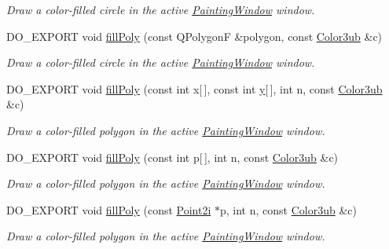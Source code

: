 \begin{DoxyCompactItemize}
\begin{DoxyCompactList}\small\item\em Draw a color-\/filled circle in the active \hyperlink{class_d_o_1_1_painting_window}{Painting\-Window} window. \end{DoxyCompactList}\item 
D\-O\-\_\-\-E\-X\-P\-O\-R\-T void \hyperlink{group___draw2_d_ga4123a714c0d3f678e3b469f668166564}{fill\-Poly} (const Q\-Polygon\-F \&polygon, const \hyperlink{group___color_types_ga018b76cd00a4f9dca7dd06246d5bd3aa}{Color3ub} \&c)
\begin{DoxyCompactList}\small\item\em Draw a color-\/filled circle in the active \hyperlink{class_d_o_1_1_painting_window}{Painting\-Window} window. \end{DoxyCompactList}\item 
D\-O\-\_\-\-E\-X\-P\-O\-R\-T void \hyperlink{group___draw2_d_gaf22fdb89e30d4c6a3dfa955bca0f9d3b}{fill\-Poly} (const int x\mbox{[}$\,$\mbox{]}, const int \hyperlink{group___channel_accessors_gac90c52c5b3a7b2a7e3761e6e84f25778}{y}\mbox{[}$\,$\mbox{]}, int n, const \hyperlink{group___color_types_ga018b76cd00a4f9dca7dd06246d5bd3aa}{Color3ub} \&c)
\begin{DoxyCompactList}\small\item\em Draw a color-\/filled polygon in the active \hyperlink{class_d_o_1_1_painting_window}{Painting\-Window} window. \end{DoxyCompactList}\item 
D\-O\-\_\-\-E\-X\-P\-O\-R\-T void \hyperlink{group___draw2_d_ga601adc22394b6713b98872874f621179}{fill\-Poly} (const int p\mbox{[}$\,$\mbox{]}, int n, const \hyperlink{group___color_types_ga018b76cd00a4f9dca7dd06246d5bd3aa}{Color3ub} \&c)
\begin{DoxyCompactList}\small\item\em Draw a color-\/filled polygon in the active \hyperlink{class_d_o_1_1_painting_window}{Painting\-Window} window. \end{DoxyCompactList}\item 
D\-O\-\_\-\-E\-X\-P\-O\-R\-T void \hyperlink{group___draw2_d_ga9bce7ee3dfbf9d22449a4cd84ab15b87}{fill\-Poly} (const \hyperlink{group___eigen_typedefs_ga048a27763e58f682b1b91af86144f701}{Point2i} $\ast$p, int n, const \hyperlink{group___color_types_ga018b76cd00a4f9dca7dd06246d5bd3aa}{Color3ub} \&c)
\begin{DoxyCompactList}\small\item\em Draw a color-\/filled polygon in the active \hyperlink{class_d_o_1_1_painting_window}{Painting\-Window} window. \end{DoxyCompactList}\item 

\end{DoxyCompactItemize}
